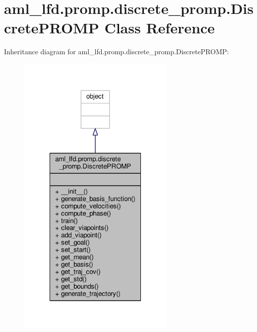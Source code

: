 \hypertarget{classaml__lfd_1_1promp_1_1discrete__promp_1_1_discrete_p_r_o_m_p}{\section{aml\-\_\-lfd.\-promp.\-discrete\-\_\-promp.\-Discrete\-P\-R\-O\-M\-P Class Reference}
\label{classaml__lfd_1_1promp_1_1discrete__promp_1_1_discrete_p_r_o_m_p}
}


Inheritance diagram for aml\-\_\-lfd.\-promp.\-discrete\-\_\-promp.\-Discrete\-P\-R\-O\-M\-P\-:\nopagebreak
\begin{figure}[H]
\begin{center}
\leavevmode
\includegraphics[width=216pt]{classaml__lfd_1_1promp_1_1discrete__promp_1_1_discrete_p_r_o_m_p__inherit__graph}
\end{center}
\end{figure}


